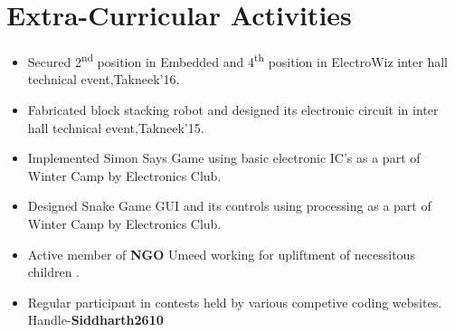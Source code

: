 \documentclass[10pt]{scrbook}
\begin{document}
\section*{Extra-Curricular Activities}
\begin{itemize}
\item Secured 2\textsuperscript{nd} position in Embedded and 4\textsuperscript{th} position in ElectroWiz inter hall technical event,Takneek'16.
\item Fabricated block stacking robot and designed its electronic circuit in inter hall technical event,Takneek'15.
\item Implemented Simon Says Game using basic electronic IC's as a part of Winter Camp by Electronics Club.
\item Designed Snake Game GUI and its controls using processing as a part of Winter Camp by Electronics Club.  
\item Active member of \textbf{NGO} Umeed working for upliftment of necessitous children .
\item Regular participant in contests held by various competive coding websites. Handle-\textbf{Siddharth2610}



\end{itemize} 
\end{document}
